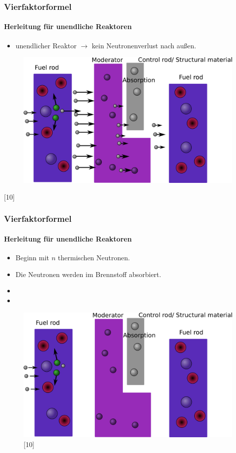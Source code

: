 \documentclass{beamer}[9pt]
\begin{document}
\begin{frame}
\frametitle{Vierfaktorformel}
\framesubtitle{Herleitung für unendliche Reaktoren}
\begin{itemize}
\item unendlicher Reaktor $\rightarrow$ kein Neutronenverlust nach außen.
\end{itemize}

\begin{figure}
\centering
\includegraphics[scale=.2]{thermal_reactor_full.png}
\end{figure}
\hspace{.5\textwidth}[10]
\end{frame}


\begin{frame}
\frametitle{Vierfaktorformel}
\framesubtitle{Herleitung für unendliche Reaktoren}
\begin{itemize}
\item Beginn mit $n$ thermischen Neutronen.
\item Die Neutronen werden im Brennstoff absorbiert.
\item[]
\item[]
\end{itemize}

\begin{figure}
\centering
\includegraphics[scale=.15]{thermal_reactor_1.png}[10]
\end{figure}

\end{frame}
\end{document}

